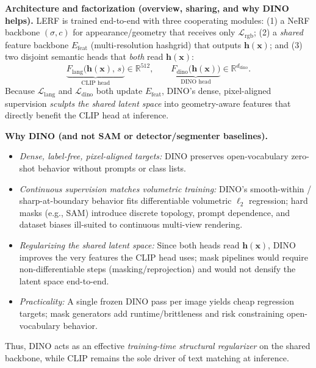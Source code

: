 \begin{enrichment}
\begin{enrichment}
        \medskip
        \noindent
        \textbf{Architecture and factorization (overview, sharing, and why DINO helps).}
        LERF is trained end-to-end with three cooperating modules: (1) a NeRF backbone \((\sigma,c)\) for appearance/geometry that receives only \(\mathcal{L}_{\text{rgb}}\); (2) a \emph{shared} feature backbone \(E_{\text{feat}}\) (multi-resolution hashgrid) that outputs \(\mathbf{h}(\mathbf{x})\); and (3) two disjoint semantic heads that \emph{both} read \(\mathbf{h}(\mathbf{x})\):
        \[
        \underbrace{F_{\text{lang}}\!\big(\mathbf{h}(\mathbf{x}),\,s\big)}_{\text{CLIP head}} \in \mathbb{R}^{512},
        \qquad
        \underbrace{F_{\text{dino}}\!\big(\mathbf{h}(\mathbf{x})\big)}_{\text{DINO head}} \in \mathbb{R}^{d_{\text{dino}}}.
        \]
        Because \(\mathcal{L}_{\text{lang}}\) and \(\mathcal{L}_{\text{dino}}\) both update \(E_{\text{feat}}\), DINO’s dense, pixel-aligned supervision \emph{sculpts the shared latent space} into geometry-aware features that directly benefit the CLIP head at inference.
        
        \noindent
        \medspace
        \textbf{Why DINO (and not SAM or detector/segmenter baselines).}
        \begin{itemize}
            \item \emph{Dense, label-free, pixel-aligned targets:} DINO preserves open-vocabulary zero-shot behavior without prompts or class lists.
            \item \emph{Continuous supervision matches volumetric training:} DINO’s smooth-within / sharp-at-boundary behavior fits differentiable volumetric \(\ell_2\) regression; hard masks (e.g., SAM) introduce discrete topology, prompt dependence, and dataset biases ill-suited to continuous multi-view rendering.
            \item \emph{Regularizing the shared latent space:} Since both heads read \(\mathbf{h}(\mathbf{x})\), DINO improves the very features the CLIP head uses; mask pipelines would require non-differentiable steps (masking/reprojection) and would not densify the latent space end-to-end.
            \item \emph{Practicality:} A single frozen DINO pass per image yields cheap regression targets; mask generators add runtime/brittleness and risk constraining open-vocabulary behavior.
        \end{itemize}
        Thus, DINO acts as an effective \emph{training-time structural regularizer} on the shared backbone, while CLIP remains the sole driver of text matching at inference.
        

\end{enrichment}
\end{enrichment}
